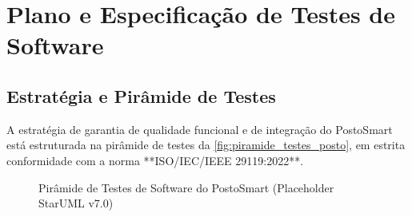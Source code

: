 
\chapter{Plano e Especificação de Testes de Software}
\label{cap:plano_testes}

\section{Estratégia e Pirâmide de Testes}

A estratégia de garantia de qualidade funcional e de integração do PostoSmart está estruturada na pirâmide de testes da \autoref{fig:piramide_testes_posto}, em estrita conformidade com a norma **ISO/IEC/IEEE 29119:2022**.

\begin{figure}[htbp]
    \centering
    \caption{Pirâmide de Testes de Software do PostoSmart (Placeholder StarUML v7.0)}
    \label{fig:piramide_testes_posto}
\end{figure}

